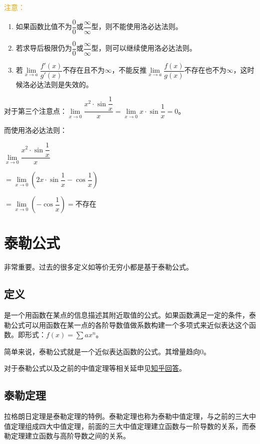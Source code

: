 \documentclass[UTF8, 12pt]{ctexart}
\begin{document}
\textcolor{orange}{注意：}

\begin{enumerate}
    \item 如果函数比值不为$\dfrac{0}{0}$或$\dfrac{\infty}{\infty}$型，则不能使用洛必达法则。
    \item 若求导后极限仍为$\dfrac{0}{0}$或$\dfrac{\infty}{\infty}$型，则可以继续使用洛必达法则。
    \item 若$\lim\limits_{x\to a}\dfrac{f'(x)}{g'(x)}$不存在且不为$\infty$，不能反推$\lim\limits_{x\to a}\dfrac{f(x)}{g(x)}$不存在也不为$\infty$，这时候洛必达法则是失效的。
\end{enumerate}

对于第三个注意点：$\lim\limits_{x\to 0}\dfrac{x^2\cdot\sin\dfrac{1}{x}}{x}=\lim\limits_{x\to 0}x\cdot\sin\dfrac{1}{x}=0$。

而使用洛必达法则：\medskip

$\lim\limits_{x\to 0}\dfrac{x^2\cdot\sin\dfrac{1}{x}}{x}$

$=\lim\limits_{x\to 0}\left(2x\cdot\sin\dfrac{1}{x}-\cos\dfrac{1}{x}\right)$

$=\lim\limits_{x\to 0}\left(-\cos\dfrac{1}{x}\right)=\text{不存在}$

\section{泰勒公式}

非常重要。过去的很多定义如等价无穷小都是基于泰勒公式。

\subsection{定义}

是一个用函数在某点的信息描述其附近取值的公式。如果函数满足一定的条件，泰勒公式可以用函数在某一点的各阶导数值做系数构建一个多项式来近似表达这个函数。即形式：$f(x)=\sum ax^n$。

简单来说，泰勒公式就是一个近似表达函数的公式。其增量趋向0。

对于泰勒公式以及之前的中值定理等相关延申见\href{https://www.zhihu.com/question/25627482}{知乎回答}。

\subsection{泰勒定理}

拉格朗日定理是泰勒定理的特例。泰勒定理也称为泰勒中值定理，与之前的三大中值定理组成四大中值定理，前面的三大中值定理建立函数与一阶导数的关系，而泰勒定理建立函数与高阶导数之间的关系。
\end{document}
